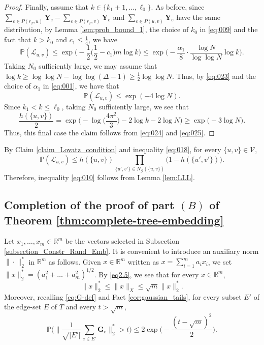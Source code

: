 \documentclass[11pt,leqno]{amsart}
\theoremstyle{remark}
\theoremstyle{plain}
\begin{document}
\begin{proof}
Finally, assume that $k\in \{k_1+1,\dots,\ell_0\}$. As before, since
$\sum_{e\in P(r_T,u)}\mathbf{Y}_e - \sum_{e\in P(r_T,v)}\mathbf{Y}_e$ and
$\sum_{e\in P(u,v)}\mathbf{Y}_e $ have the same distribution, by Lemma \ref{lem:prob_bound_1},
the choice of $k_0$ in \eqref{eq:009} and the fact that $k>k_0$ and $c_1\leqslant\frac{1}{4}$, we have
\begin{equation}\label{eq:023}
\mathbb{P}(\mathcal{L}_{u,v}) \leqslant \exp\Big(-\frac{1}{2} \Big(\frac{1}{2}-c_1\Big)m\log k \Big)
\leqslant \exp\Big( -\frac{\alpha_1}{8} \cdot \frac{\log N}{\log\log N} \log k \Big).
\end{equation}
Taking $N_0$ sufficiently large, we may assume that
$\log k \geqslant \log \log N - \log\log(\Delta-1) \geqslant \frac{1}{2}\log\log N$.
Thus, by \eqref{eq:023} and the choice of $\alpha_1$ in \eqref{eq:001}, we have that
\begin{equation}\label{eq:024}
\mathbb{P}(\mathcal{L}_{u,v})\leqslant \exp( -4\log N).
\end{equation}
Since $k_1 < k \leqslant \ell_0$, taking $N_0$ sufficiently large, we see that
\begin{equation} \label{eq:025}
\frac{h(\{u,v\})}{2} = \exp\Big(-\log\Big(\frac{4\pi^2}{3}\Big) -2\log k -2\log N\Big)
\geqslant \exp\Big(- 3\log N \Big).
\end{equation}
Thus, this final case the claim follows from  \eqref{eq:024} and \eqref{eq:025}.
\end{proof}
By Claim \ref{claim_Lovatz_condition} and inequality \eqref{eq:018},  for every $\{u,v\}\in \mathcal{V}$,
\[ \mathbb{P}(\mathcal{L}_{u,v})\leqslant h(\{u,v\})
\prod_{\{u',v'\}\in N_{\mathcal{G}}(\{u,v\})} \big(1-h(\{u',v'\})\big). \]
Therefore, inequality \eqref{eq:010} follows from Lemma \ref{lem:LLL}.

\subsection{Completion of the proof of part $(B)$ of Theorem \ref{thm:complete-tree-embedding}}

Let $x_1,\dots,x_m\in\mathbb{R}^m$ be the vectors selected in Subsection \ref{subsection_Constr_Rand_Emb}.
It is convenient to introduce an auxiliary norm $\|\cdot\|_2^*$ in $\mathbb{R}^m$ as follows.
Given $x\in \mathbb{R}^m$ written as $x = \sum_{i=1}^{m} a_i x_i$, we set
$\|x\|_2^* = (a_1^2+\dots+a_m^2)^{1/2}$. By \eqref{eq2.5}, we see that for every $x\in\mathbb{R}^m$,
\begin{equation}\label{eq:026}
  \|x\|_2^* \leqslant \|x\|_X \leqslant \sqrt{m}\|x\|_2^*.
\end{equation}
Moreover, recalling \eqref{eq:G-def} and Fact \ref{cor:gaussian_tails}, for every subset $E'$ of the edge-set $E$ of $T$ and
every $t>\sqrt{m}$,
\begin{equation}\label{eq:027}
    \mathbb{P}\Bigg( \Big\|\frac{1}{\sqrt{|E'|}}\sum_{e\in E'}\mathbf{G}_e\Big\|_2^*>t \Bigg)
    \leqslant 2\exp \Big( -\frac{(t-\sqrt{m})^2}{2} \Big).
\end{equation}
\end{document}
